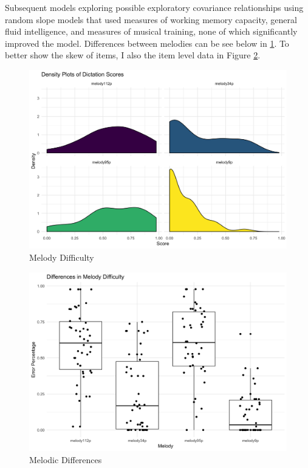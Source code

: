 \documentclass[]{book}
\begin{document}
Subsequent models exploring possible exploratory covariance relationships using random slope models that used measures
of working memory capacity, general fluid intelligence, and measures of musical training, none of which significantly improved the model.
Differences between melodies can be see below in \ref{fig:eboxplot}.
To better show the skew of items, I also the item level data in Figure \ref{fig:edistribution}.

\begin{figure}

{\centering \includegraphics[width=1\linewidth]{img/melody_difficulty} 

}

\caption{Melody Difficulty}\label{fig:eboxplot}
\end{figure}

\begin{figure}

{\centering \includegraphics[width=1\linewidth]{img/melody_differences} 

}

\caption{Melodic Differences}\label{fig:edistribution}
\end{figure}
\end{document}
